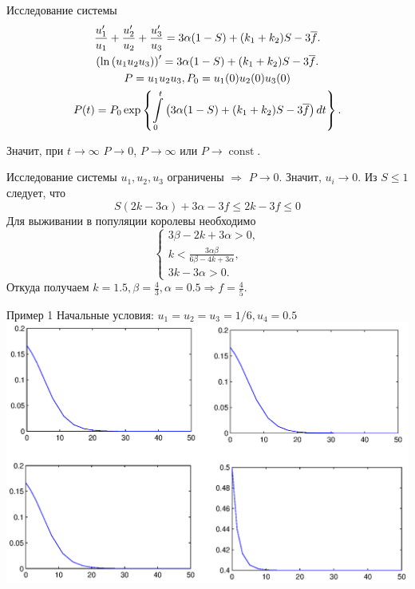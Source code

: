\documentclass{beamer}
\newcommand{\const}{\ensuremath{\operatorname{const}}}
\begin{document}
\begin{frame}{Исследование системы}
\begin{gather}
	\frac{u_1'}{u_1} + \frac{u_2'}{u_2} + \frac{u_3'}{u_3} = 3\alpha(1 - S) + (k_1 + k_2) S - 3\overline{f}. \notag \\
	\left( \ln \left( u_1 u_2 u_3 \right) \right)' = 3\alpha(1 - S) + (k_1 + k_2) S - 3\overline{f}. \notag \\
	P = u_1 u_2 u_3, P_0 = u_1(0) u_2(0) u_3(0) \notag \\
	P(t) = P_0 \exp \left\{ \int\limits_0^t \left( 3\alpha(1 - S) + (k_1 + k_2) S - 3\overline{f} \right) dt \right\}. \notag
\end{gather}

Значит, при $t \to \infty$ $P \to 0$, $P \to \infty$ или $P \to \const$.
\end{frame}

\begin{frame}{Исследование системы}
$u_1, u_2, u_3$ ограничены $\Rightarrow$ $P \to 0$. Значит, $u_i \to 0$.
Из $S \leqslant 1$ следует, что
$$
S(2k - 3\alpha) + 3\alpha - 3f \leqslant 2k - 3f \leqslant 0
$$
Для выживании в популяции королевы необходимо
$$
\left\{
\begin{aligned}
3\beta - 2k + 3\alpha > 0, \\
k < \frac{3\alpha\beta}{6\beta - 4k + 3\alpha}, \\
3k - 3\alpha > 0.
\end{aligned}
\right.
$$
Откуда получаем $k = 1.5, \beta = \frac{4}{3}, \alpha = 0.5 \Rightarrow f = \frac{4}{5}$.
\end{frame}

\begin{frame}{Пример 1}
Начальные условия:
$u_1 = u_2 = u_3 = 1/6, u_4 = 0.5$
\includegraphics[scale=0.5]{pics/br.eps}
\end{frame}
\end{document}
